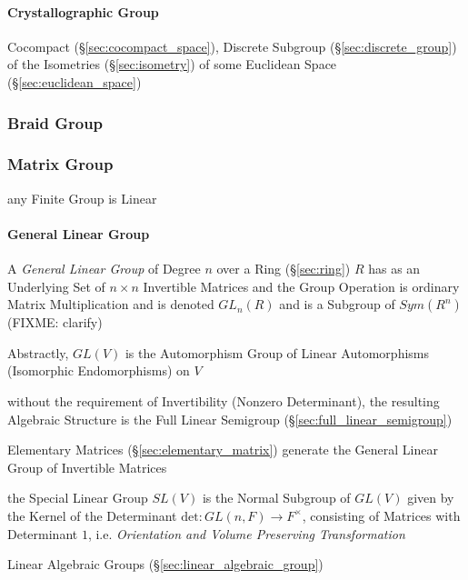\begin{itemize}
\paragraph{Crystallographic Group}\label{sec:crystallographic_group}\hfill

Cocompact (\S\ref{sec:cocompact_space}), Discrete Subgroup
(\S\ref{sec:discrete_group}) of the Isometries (\S\ref{sec:isometry}) of some
Euclidean Space (\S\ref{sec:euclidean_space})



\subsubsection{Braid Group}\label{sec:braid_group}

\subsubsection{Matrix Group}\label{sec:matrix_group}

any Finite Group is Linear



\paragraph{General Linear Group}\label{sec:general_linear_group}\hfill

A \emph{General Linear Group} of Degree $n$ over a Ring (\S\ref{sec:ring}) $R$
has as an Underlying Set of $n \times n$ Invertible Matrices and the Group
Operation is ordinary Matrix Multiplication and is denoted $GL_n(R)$ and is a
Subgroup of $Sym(R^n)$ (FIXME: clarify)

Abstractly, $GL(V)$ is the Automorphism Group of Linear Automorphisms
(Isomorphic Endomorphisms) on $V$

without the requirement of Invertibility (Nonzero Determinant), the resulting
Algebraic Structure is the Full Linear Semigroup
(\S\ref{sec:full_linear_semigroup})

Elementary Matrices (\S\ref{sec:elementary_matrix}) generate the General Linear
Group of Invertible Matrices

the Special Linear Group $SL(V)$ is the Normal Subgroup of $GL(V)$ given by the
Kernel of the Determinant $\mathrm{det} : GL(n,F) \rightarrow F^\times$,
consisting of Matrices with Determinant $1$, i.e. \emph{Orientation and Volume
  Preserving Transformation}

\fist Linear Algebraic Groups (\S\ref{sec:linear_algebraic_group})


\end{itemize}
